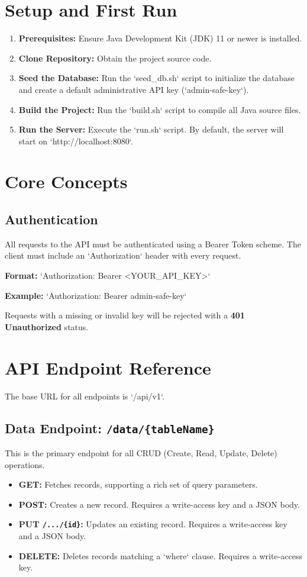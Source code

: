 \documentclass[12pt, a4paper]{report}
\begin{document}
\section{Setup and First Run}
\begin{enumerate}
    \item \textbf{Prerequisites:} Ensure Java Development Kit (JDK) 11 or newer is installed.
    \item \textbf{Clone Repository:} Obtain the project source code.
    \item \textbf{Seed the Database:} Run the `seed_db.sh` script to initialize the database and create a default administrative API key (`admin-safe-key`).
    \item \textbf{Build the Project:} Run the `build.sh` script to compile all Java source files.
    \item \textbf{Run the Server:} Execute the `run.sh` script. By default, the server will start on `http://localhost:8080`.
\end{enumerate}

\section{Core Concepts}
\subsection{Authentication}
All requests to the API must be authenticated using a Bearer Token scheme. The client must include an `Authorization` header with every request.

\textbf{Format:} `Authorization: Bearer <YOUR_API_KEY>`

\textbf{Example:} `Authorization: Bearer admin-safe-key`

Requests with a missing or invalid key will be rejected with a \textbf{401 Unauthorized} status.

\section{API Endpoint Reference}
The base URL for all endpoints is `/api/v1`.

\subsection{Data Endpoint: \texttt{/data/\{tableName\}}}
This is the primary endpoint for all CRUD (Create, Read, Update, Delete) operations.
\begin{itemize}
    \item \textbf{GET:} Fetches records, supporting a rich set of query parameters.
    \item \textbf{POST:} Creates a new record. Requires a write-access key and a JSON body.
    \item \textbf{PUT \texttt{/.../\{id\}}:} Updates an existing record. Requires a write-access key and a JSON body.
    \item \textbf{DELETE:} Deletes records matching a `where` clause. Requires a write-access key.
\end{itemize}
\end{document}
